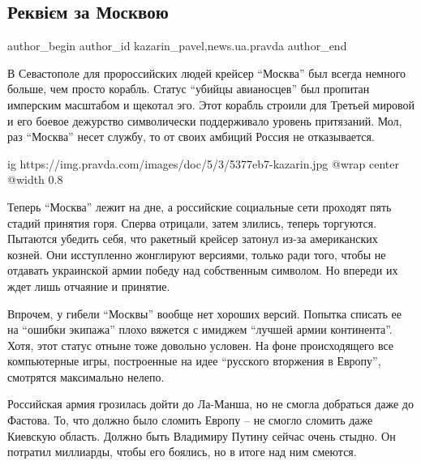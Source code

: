 
 
 
 
 
 
\subsection{Реквієм за Москвою}
\label{sec:17_04_2022.stz.news.ua.pravda.1.rekviem_za_moskvoju}
 
\ifcmt
 author_begin
   author_id kazarin_pavel,news.ua.pravda
 author_end
\fi

В Севастополе для пророссийских людей крейсер \enquote{Москва} был всегда немного
больше, чем просто корабль. Статус \enquote{убийцы авианосцев} был пропитан имперским
масштабом и щекотал эго. Этот корабль строили для Третьей мировой и его боевое
дежурство символически поддерживало уровень притязаний. Мол, раз \enquote{Москва} несет
службу, то от своих амбиций Россия не отказывается.

\ifcmt
  ig https://img.pravda.com/images/doc/5/3/5377eb7-kazarin.jpg
  @wrap center
  @width 0.8
\fi

Теперь \enquote{Москва} лежит на дне, а российские социальные сети проходят пять стадий
принятия горя. Сперва отрицали, затем злились, теперь торгуются. Пытаются
убедить себя, что ракетный крейсер затонул из-за американских козней. Они
исступленно жонглируют версиями, только ради того, чтобы не отдавать украинской
армии победу над собственным символом. Но впереди их ждет лишь отчаяние и
принятие.

Впрочем, у гибели \enquote{Москвы} вообще нет хороших версий. Попытка списать ее на
\enquote{ошибки экипажа} плохо вяжется с имиджем \enquote{лучшей армии континента}. Хотя, этот
статус отныне тоже довольно условен. На фоне происходящего все компьютерные
игры, построенные на идее \enquote{русского вторжения в Европу}, смотрятся максимально
нелепо.

Российская армия грозилась дойти до Ла-Манша, но не смогла добраться даже до
Фастова. То, что должно было сломить Европу – не смогло сломить даже Киевскую
область. Должно быть Владимиру Путину сейчас очень стыдно. Он потратил
миллиарды, чтобы его боялись, но в итоге над ним смеются.

